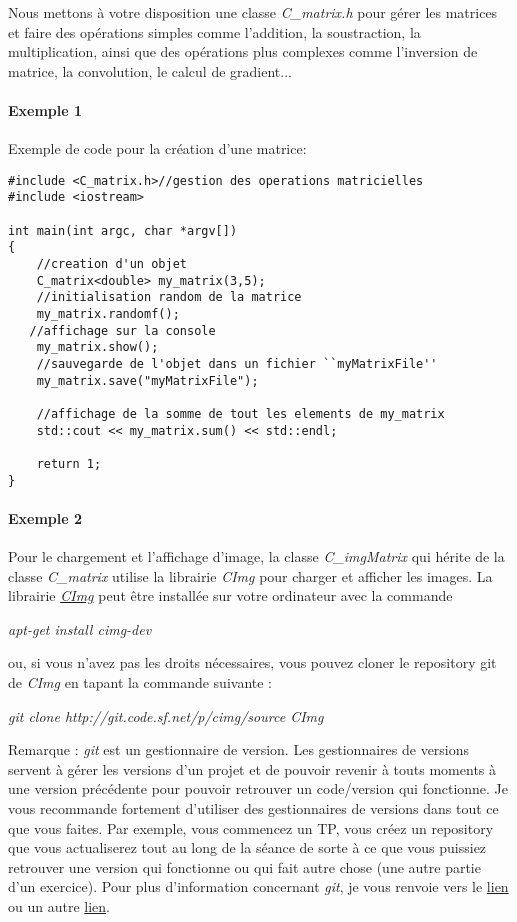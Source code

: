 \documentclass[10pt,a4paper]{article}
\begin{document}
Nous mettons \`{a} votre disposition une classe \textit{C\_matrix.h} pour g\'{e}rer les matrices et faire des op\'{e}rations simples comme l'addition, la soustraction, la multiplication, ainsi que des op\'{e}rations plus complexes comme l'inversion de matrice, la convolution, le calcul de gradient...

\paragraph{Exemple 1}
Exemple de code pour la cr\'{e}ation d'une matrice: 
\begin{verbatim}
#include <C_matrix.h>//gestion des operations matricielles
#include <iostream>

int main(int argc, char *argv[])
{
    //creation d'un objet
    C_matrix<double> my_matrix(3,5);
    //initialisation random de la matrice
    my_matrix.randomf();
   //affichage sur la console
    my_matrix.show();
    //sauvegarde de l'objet dans un fichier ``myMatrixFile''
    my_matrix.save("myMatrixFile");

    //affichage de la somme de tout les elements de my_matrix
    std::cout << my_matrix.sum() << std::endl;

    return 1;
}
\end{verbatim}

\paragraph{Exemple 2} Pour le chargement et l'affichage d'image, la classe \textit{C\_imgMatrix} qui h\'{e}rite de la classe \textit{C\_matrix} utilise la librairie \textit{CImg} pour charger et afficher les images. La librairie \href{http://cimg.sourceforge.net/reference/group__cimg__tutorial.html}{\textit{CImg}} peut \^{e}tre install\'{e}e sur votre ordinateur avec la commande 
\begin{center}
	\textit{apt-get install cimg-dev}
\end{center}
ou, si vous n'avez pas les droits n\'{e}cessaires, vous pouvez cloner le repository git de \textit{CImg} en tapant la commande suivante : 
\begin{center}
	\textit{git clone http://git.code.sf.net/p/cimg/source CImg}
\end{center}
Remarque : \textit{git} est un gestionnaire de version. Les gestionnaires de versions servent \`{a} g\'{e}rer les versions d'un projet et de pouvoir revenir \`{a} touts moments \`{a} une version pr\'{e}c\'{e}dente pour pouvoir retrouver un code/version qui fonctionne. Je vous recommande fortement d'utiliser des gestionnaires de versions dans tout ce que vous faites. Par exemple, vous commencez un TP, vous cr\'{e}ez un repository que vous actualiserez tout au long de la s\'{e}ance de sorte \`{a} ce que vous puissiez retrouver une version qui fonctionne ou qui fait autre chose (une autre partie d'un exercice). Pour plus d'information concernant \textit{git}, je vous renvoie vers le \href{https://github.com/}{lien} ou un autre \href{http://rogerdudler.github.io/git-guide/}{lien}.
\end{document}
